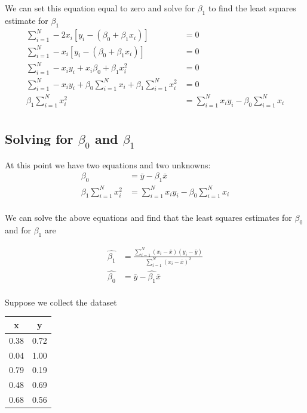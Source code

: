 We can set this equation equal to zero and solve for $\beta_{1}$ to find the least squares estimate for $\beta_{1}$
\begin{align}
    \sum_{i=1}^{N} -2x_{i}\left[y_{i} - \left(\beta_{0} + \beta_{1}x_{i} \right) \right] &= 0\\
    \sum_{i=1}^{N} -x_{i}\left[y_{i} - \left(\beta_{0} + \beta_{1}x_{i} \right) \right] &= 0\\
    \sum_{i=1}^{N} -x_{i} y_{i} + x_{i}\beta_{0} + \beta_{1}x^{2}_{i} &= 0\\
    \sum_{i=1}^{N} -x_{i} y_{i} + \beta_{0} \sum_{i=1}^{N} x_{i} + \beta_{1} \sum_{i=1}^{N} x^{2}_{i} &= 0\\
    \beta_{1} \sum_{i=1}^{N} x^{2}_{i} &= \sum_{i=1}^{N} x_{i} y_{i} - \beta_{0} \sum_{i=1}^{N} x_{i} \\
\end{align}

\subsection{Solving for $\beta_{0}$ and $\beta_{1}$}
At this point we have two equations and two unknowns:
\begin{align}
    \beta_{0} &= \bar{y} - \beta_{1} \bar{x} \\ 
     \beta_{1} \sum_{i=1}^{N} x^{2}_{i} &= \sum_{i=1}^{N} x_{i} y_{i} - \beta_{0} \sum_{i=1}^{N} x_{i} \\
\end{align}

We can solve the above equations and find that the least squares estimates for $\beta_{0}$ and for $\beta_{1}$ are

\begin{align}
    \hat{\beta_{1}} &= \frac{ \sum_{i=1}^{N} (x_{i} - \bar{x})(y_{i} - \bar{y})  }{ \sum_{i=1}^{N} (x_{i} - \bar{x})^{2} }\\
    \hat{\beta_{0}} &= \bar{y} - \hat{\beta_{1}} \bar{x} \\
\end{align}

\ex Suppose we collect the dataset 
\begin{table}[ht!]
    \centering
    \begin{tabular}{c|c}
        x & y \\
        \hline
        0.38 & 0.72\\
        0.04 & 1.00\\
        0.79 & 0.19\\
        0.48 & 0.69\\
        0.68 & 0.56\\
    \end{tabular}
\end{table}


